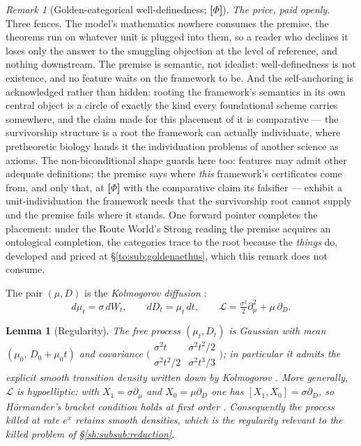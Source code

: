 \documentclass[11pt]{article}
\numberwithin{equation}{section}
\theoremstyle{plain}
\newtheorem{lemma}[theorem]{Lemma}
\theoremstyle{definition}
\theoremstyle{remark}
\newtheorem{remark}[theorem]{Remark}
\newcommand{\Lc}{\mathcal{L}}
\begin{document}
\begin{remark}[Golden-categorical well-definedness; \textbf{[$\Phi$]}]
\emph{The price, paid openly.} Three fences. The model's mathematics
nowhere consumes the premise, the theorems run on whatever unit is
plugged into them, so a reader who declines it loses only the
answer to the smuggling objection at the level of reference, and
nothing downstream. The premise is semantic, not idealist:
well-definedness is not existence, and no feature waits on the
framework to be. And the self-anchoring is acknowledged rather than
hidden: rooting the framework's semantics in its own central object
is a circle of exactly the kind every foundational scheme carries
somewhere, and the claim made for this placement of it is
comparative --- the survivorship structure is a root the framework
can actually individuate, where pretheoretic biology hands it the
individuation problems of another science as axioms. The
non-biconditional shape guards here too: features may admit other
adequate definitions; the premise says where \emph{this} framework's
certificates come from, and only that, at \textbf{[$\Phi$]} with the
comparative claim its falsifier --- exhibit a unit-individuation the
framework needs that the survivorship root cannot supply and the
premise fails where it stands. One forward pointer completes the
placement: under the Route World's Strong reading the premise acquires
an ontological completion, the categories trace to the root because
the \emph{things} do, developed and priced at
\S\ref{to:sub:goldenaethus}, which this remark does not consume.
\end{remark}

The pair $(\mu,D)$ is the \emph{Kolmogorov diffusion} \cite{Kol34}:
\begin{equation}\label{sh:eq:kolm}
d\mu_t=\sigma\,dW_t,\qquad dD_t=\mu_t\,dt,\qquad
\Lc=\tfrac{\sigma^2}{2}\partial_\mu^2+\mu\,\partial_D .
\end{equation}

\begin{lemma}[Regularity]\label{sh:lem:hypo}
The free process $(\mu_t,D_t)$ is Gaussian with mean
$(\mu_0,\,D_0+\mu_0t)$ and covariance
$\bigl(\begin{smallmatrix}\sigma^2t&\sigma^2t^2/2\\
\sigma^2t^2/2&\sigma^2t^3/3\end{smallmatrix}\bigr)$;
in particular it admits the explicit smooth transition density written down
by Kolmogorov \cite{Kol34}. More generally, $\Lc$ is hypoelliptic: with
$X_1=\sigma\partial_\mu$ and $X_0=\mu\partial_D$ one has
$[X_1,X_0]=\sigma\partial_D$, so H\"ormander's bracket condition holds at
first order \cite{Hor67}. Consequently the process killed at rate $e^{x}$
retains smooth densities, which is the regularity relevant to the killed
problem of \S\ref{sh:subsub:reduction}.
\end{lemma}
\end{document}
